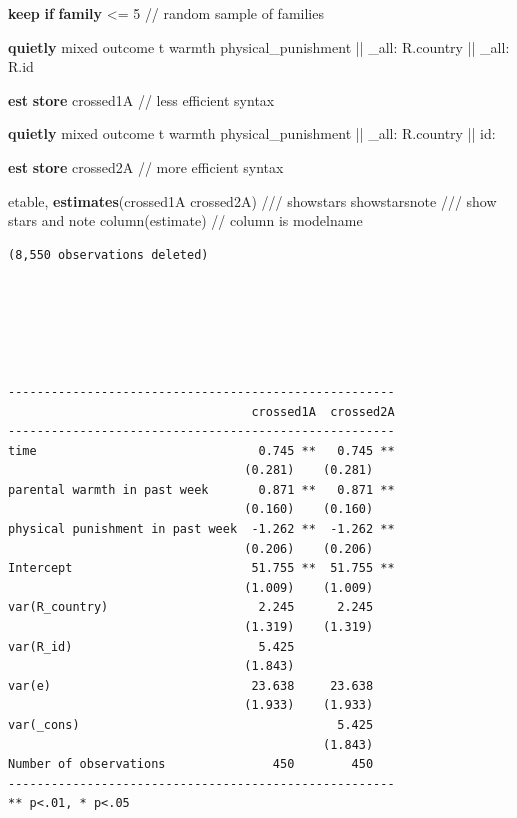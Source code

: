 \documentclass[
  letterpaper,
  DIV=11,
  numbers=noendperiod]{scrreprt}
\newenvironment{Shaded}{\begin{snugshade}}{\end{snugshade}}
\newcommand{\CommentTok}[1]{\textcolor[rgb]{0.37,0.37,0.37}{#1}}
\newcommand{\DataTypeTok}[1]{\textcolor[rgb]{0.68,0.00,0.00}{#1}}
\newcommand{\KeywordTok}[1]{\textcolor[rgb]{0.00,0.23,0.31}{\textbf{#1}}}
\newcommand{\NormalTok}[1]{\textcolor[rgb]{0.00,0.23,0.31}{#1}}
\begin{document}
\begin{Shaded}
\begin{Highlighting}[]

\KeywordTok{keep} \KeywordTok{if} \KeywordTok{family}\NormalTok{ \textless{}= 5 }\CommentTok{// random sample of families}
    
\KeywordTok{quietly}\NormalTok{ mixed outcome t warmth physical\_punishment || }\DataTypeTok{\_all}\NormalTok{: R.country || }\DataTypeTok{\_all}\NormalTok{: R.id}
    
\KeywordTok{est} \KeywordTok{store}\NormalTok{ crossed1A }\CommentTok{// less efficient syntax}
    
\KeywordTok{quietly}\NormalTok{ mixed outcome t warmth physical\_punishment || }\DataTypeTok{\_all}\NormalTok{: R.country || id:}
    
\KeywordTok{est} \KeywordTok{store}\NormalTok{ crossed2A }\CommentTok{// more efficient syntax}
    
\NormalTok{etable, }\KeywordTok{estimates}\NormalTok{(crossed1A crossed2A) }\CommentTok{///}
\NormalTok{showstars showstarsnote }\CommentTok{/// show stars and note}
\NormalTok{column(estimate) }\CommentTok{// column is modelname}
\end{Highlighting}
\end{Shaded}

\begin{verbatim}
(8,550 observations deleted)






------------------------------------------------------
                                  crossed1A  crossed2A
------------------------------------------------------
time                               0.745 **   0.745 **
                                 (0.281)    (0.281)   
parental warmth in past week       0.871 **   0.871 **
                                 (0.160)    (0.160)   
physical punishment in past week  -1.262 **  -1.262 **
                                 (0.206)    (0.206)   
Intercept                         51.755 **  51.755 **
                                 (1.009)    (1.009)   
var(R_country)                     2.245      2.245   
                                 (1.319)    (1.319)   
var(R_id)                          5.425              
                                 (1.843)              
var(e)                            23.638     23.638   
                                 (1.933)    (1.933)   
var(_cons)                                    5.425   
                                            (1.843)   
Number of observations               450        450   
------------------------------------------------------
** p<.01, * p<.05
\end{verbatim}
\end{document}
